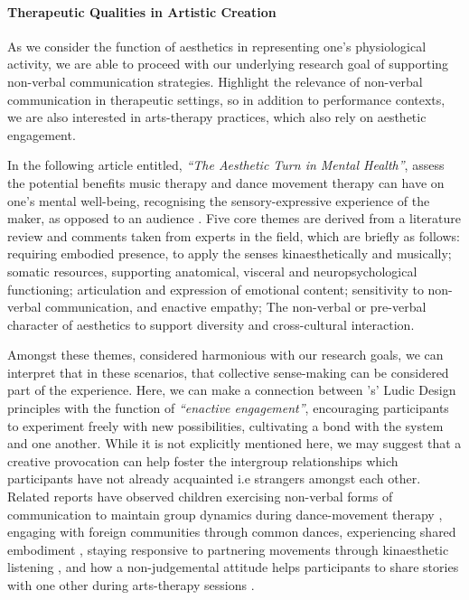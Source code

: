 \paragraph{Therapeutic Qualities in Artistic Creation}

As we consider the function of aesthetics in representing one's physiological activity, we are able to proceed with our underlying research goal of supporting non-verbal communication strategies. Highlight the relevance of non-verbal communication in therapeutic settings, so in addition to performance contexts, we are also interested in arts-therapy practices, which also rely on aesthetic engagement.

In the following article entitled, \textit{``The Aesthetic Turn in Mental Health''}, \citeauthor{samaritter_aesthetic_2018} assess the potential benefits music therapy and dance movement therapy can have on one's mental well-being, recognising the sensory-expressive experience of the maker, as opposed to an audience \cite{samaritter_aesthetic_2018}. Five core themes are derived from a literature review and comments taken from experts in the field, which are briefly as follows: requiring embodied presence, to apply the senses kinaesthetically and musically; somatic resources, supporting anatomical, visceral and neuropsychological functioning; articulation and expression of emotional content; sensitivity to non-verbal communication, and enactive empathy; The non-verbal or pre-verbal character of aesthetics to support diversity and cross-cultural interaction.

Amongst these themes, considered harmonious with our research goals, we can interpret that in these scenarios, that collective sense-making can be considered part of the experience. Here, we can make a connection between \citeauthor{gaver_drift_2004}'s' Ludic Design principles \cite{gaver_drift_2004} with the function of \textit{``enactive engagement''}, encouraging participants to experiment freely with new possibilities, cultivating a bond with the system and one another. While it is not explicitly mentioned here, we may suggest that a creative provocation can help foster the intergroup relationships which participants have not already acquainted i.e strangers amongst each other. Related reports have observed children exercising non-verbal forms of communication to maintain group dynamics during dance-movement therapy \cite{ylonen_kinaesthetic_2009}, engaging with foreign communities through common dances, experiencing shared embodiment \cite{hoppu_other_2013}, staying responsive to partnering movements through kinaesthetic listening \cite{ylonen_bodily_2003}, and how a non-judgemental attitude helps participants to share stories with one other during arts-therapy sessions \cite{kalmanowitz_out_2016}.

